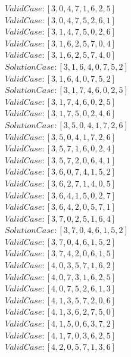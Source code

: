 \documentclass[a4paper,12pt]{article}
\begin{document}
				$Valid Case   : [3, 0, 4, 7, 1, 6, 2, 5]$\\
				$Valid Case   : [3, 0, 4, 7, 5, 2, 6, 1]$\\
				$Valid Case   : [3, 1, 4, 7, 5, 0, 2, 6]$\\
				$Valid Case   : [3, 1, 6, 2, 5, 7, 0, 4]$\\
				$Valid Case   : [3, 1, 6, 2, 5, 7, 4, 0]$\\
				$Solution Case: [3, 1, 6, 4, 0, 7, 5, 2]$\\
				$Valid Case   : [3, 1, 6, 4, 0, 7, 5, 2]$\\
				$Solution Case: [3, 1, 7, 4, 6, 0, 2, 5]$\\
				$Valid Case   : [3, 1, 7, 4, 6, 0, 2, 5]$\\
				$Valid Case   : [3, 1, 7, 5, 0, 2, 4, 6]$\\
				$Solution Case: [3, 5, 0, 4, 1, 7, 2, 6]$\\
				$Valid Case   : [3, 5, 0, 4, 1, 7, 2, 6]$\\
				$Valid Case   : [3, 5, 7, 1, 6, 0, 2, 4]$\\
				$Valid Case   : [3, 5, 7, 2, 0, 6, 4, 1]$\\
				$Valid Case   : [3, 6, 0, 7, 4, 1, 5, 2]$\\
				$Valid Case   : [3, 6, 2, 7, 1, 4, 0, 5]$\\
				$Valid Case   : [3, 6, 4, 1, 5, 0, 2, 7]$\\
				$Valid Case   : [3, 6, 4, 2, 0, 5, 7, 1]$\\
				$Valid Case   : [3, 7, 0, 2, 5, 1, 6, 4]$\\
				$Solution Case: [3, 7, 0, 4, 6, 1, 5, 2]$\\
				$Valid Case   : [3, 7, 0, 4, 6, 1, 5, 2]$\\
				$Valid Case   : [3, 7, 4, 2, 0, 6, 1, 5]$\\
				$Valid Case   : [4, 0, 3, 5, 7, 1, 6, 2]$\\
				$Valid Case   : [4, 0, 7, 3, 1, 6, 2, 5]$\\
				$Valid Case   : [4, 0, 7, 5, 2, 6, 1, 3]$\\
				$Valid Case   : [4, 1, 3, 5, 7, 2, 0, 6]$\\
				$Valid Case   : [4, 1, 3, 6, 2, 7, 5, 0]$\\
				$Valid Case   : [4, 1, 5, 0, 6, 3, 7, 2]$\\
				$Valid Case   : [4, 1, 7, 0, 3, 6, 2, 5]$\\
				$Valid Case   : [4, 2, 0, 5, 7, 1, 3, 6]$\\
\end{document}

